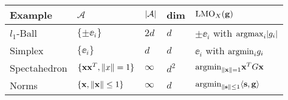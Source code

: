 \begin{center}
    \begin{tabular}{ |P{6em}|P{7em}|P{1em}|P{1em}|P{10em}| } 
        \hline
        Example & $\mathcal{A}$ & $\abs{\mathcal{A}}$ & dim & $\mathrm{LMO}_X(\mathbf{g})$ \\
        \hline
        $l_1$-Ball & $\{\pm \ee_i\}$ & $2d$ & $d$ & $\pm \ee_i$ with $\mathrm{argmax}_i{\abs{g_i}}$ \\
        Simplex & $\{\ee_i\}$ & $d$ & $d$ & $\ee_i$ with $\mathrm{argmin}_i{g_i}$ \\
        Spectahedron & $\{\mathbf{x} \mathbf{x}^T, \norm{x}=1 \}$ & $\infty$ & $d^2$ & $\mathrm{argmin}_{\norm{\mathbf{x}}=1}{\mathbf{x}^T G \mathbf{x}}$ \\
        Norms & $\{\mathbf{x}, \norm{\mathbf{x}} \leq 1 \}$ & $\infty$ & $d$ & $\mathrm{argmin}_{\norm{\mathbf{s}} \leq 1}{\langle \mathbf{s}, \mathbf{g} \rangle}$ \\
        \hline
    \end{tabular}
\end{center}
